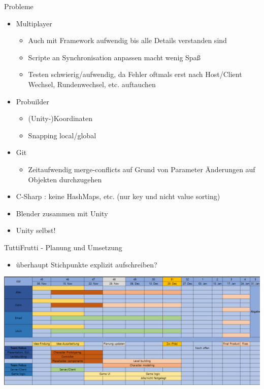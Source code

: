 \documentclass[xcolor=dvipsnames]{beamer}
\begin{document}
\begin{frame}{Probleme}
\begin{itemize}
 \item Multiplayer 
 	\begin{itemize}
 		\item Auch mit Framework aufwendig bis alle Details verstanden sind
 		\item Scripte an Synchronisation anpassen macht wenig Spaß
 		\item Testen schwierig/aufwendig, da Fehler oftmals erst nach Host/Client Wechsel, Rundenwechsel, etc. auftauchen
 	\end{itemize}
 \item Probuilder
 	\begin{itemize}
 		\item (Unity-)Koordinaten 
 		\item Snapping local/global
 	\end{itemize}
  \item Git
 	\begin{itemize}
 		\item Zeitaufwendig merge-conflicts auf Grund von Parameter Änderungen auf Objekten durchzugehen
 	\end{itemize}
  \item C-Sharp : keine HashMaps, etc. (nur key und nicht value sorting)
  \item Blender zusammen mit Unity 
  \item Unity selbst!
\end{itemize}
	
\end{frame}

\begin{frame}{TuttiFrutti - Planung und Umsetzung}
\begin{itemize}
		\item überhaupt Stichpunkte explizit aufschreiben?
\end{itemize}
\begin{center}
		\includegraphics[width=1\textwidth]{ProjektPlanung_6times90.png}
\end{center}

\end{frame}
\end{document}
